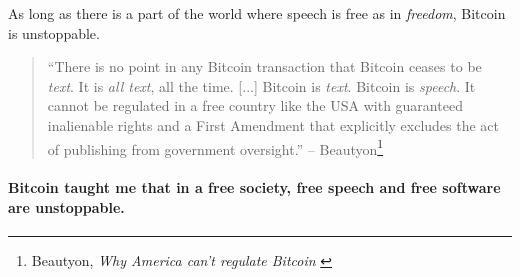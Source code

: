 As long as there is a part of the world where speech is free as in
\textit{freedom}, Bitcoin is unstoppable.

\begin{samepage}\begin{quotation}
\enquote{There is no point in any Bitcoin transaction that Bitcoin ceases to be
\textit{text}. It is \textit{all text}, all the time. [...] Bitcoin is
\textit{text}. Bitcoin is \textit{speech}. It cannot be regulated in a free
country like the USA with guaranteed inalienable rights and a First Amendment
that explicitly excludes the act of publishing from government oversight.}
\flushright -- Beautyon\footnote{Beautyon, \textit{Why America can't regulate
Bitcoin} \cite{america-regulate-bitcoin}}
\end{quotation}\end{samepage}

\paragraph{Bitcoin taught me that in a free society, free speech and free software
are unstoppable.}

%
%
%
%
%
%
%
